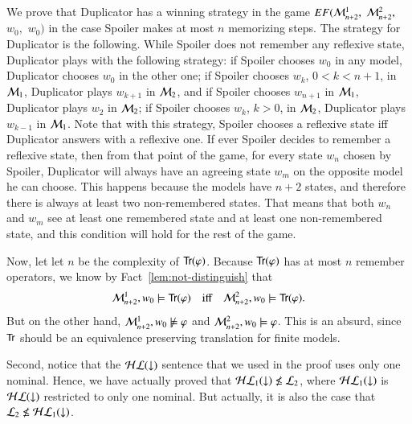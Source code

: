 \begin{pf}
\begin{pf}
We prove that Duplicator has a winning strategy in the game
$EF(\mathcal{M}^1_{n+2},$ $\mathcal{M}^2_{n+2},$ $w_0,$ $w_0)$ in the case Spoiler
makes at most $n$ memorizing steps. The strategy for Duplicator is
the following. While Spoiler does not remember any reflexive state,
Duplicator plays with the following strategy: if Spoiler chooses
$w_0$ in any model, Duplicator chooses $w_0$ in the other one; if
Spoiler chooses $w_k$, $0 < k < n+1$, in $\mathcal{M}_1$, Duplicator
plays $w_{k+1}$ in $\mathcal{M}_2$, and if Spoiler chooses $w_{n+1}$ in
$\mathcal{M}_1$, Duplicator plays $w_2$ in $\mathcal{M}_2$; if Spoiler chooses
$w_k$, $k > 0$, in $\mathcal{M}_2$, Duplicator plays $w_{k-1}$ in
$\mathcal{M}_1$. Note that with this strategy, Spoiler chooses a
reflexive state iff Duplicator answers with a reflexive one. If ever
Spoiler decides to remember a reflexive state, then from that point
of the game, for every state $w_n$ chosen by Spoiler, Duplicator
will always have an agreeing state $w_m$ on the opposite model he
can choose. This happens because the models have $n+2$ states, and
therefore there is always at least two non-remembered states. That
means that both $w_n$ and $w_m$ see at least one remembered state
and at least one non-remembered state, and this condition will hold
for the rest of the game.
\end{pf}
%
Now, let let $n$ be the complexity of ${\sf Tr}(\varphi)$. Because
${\sf Tr}(\varphi)$ has at most $n$ remember operators, we know by
Fact~\ref{lem:not-distinguish} that
\[
\mathcal{M}^1_{n+2}, w_0 \models {\sf Tr}(\varphi) \mbox{\quad
iff\quad}\mathcal{M}^2_{n+2}, w_0 \models {\sf Tr}(\varphi).
\]
But on the other hand, $\mathcal{M}^1_{n+2}, w_0
\not \models \varphi$ and $\mathcal{M}^2_{n+2}, w_0 \models \varphi$.
This is an absurd, since ${\sf Tr}$ should be an equivalence preserving
translation for finite models.
\end{pf}




Second, notice that the $\mathcal{HL}({\downarrow})$ sentence that we used in the proof
uses only one nominal.  Hence, we have actually proved that
$\mathcal{HL}_1({\downarrow})\not\le\mathcal{L}_2$, where $\mathcal{HL}_1({\downarrow})$ is $\mathcal{HL}({\downarrow})$
restricted to only one nominal.  But actually, it is also the case
that $\mathcal{L}_2 \not\le\mathcal{HL}_1({\downarrow})$.


